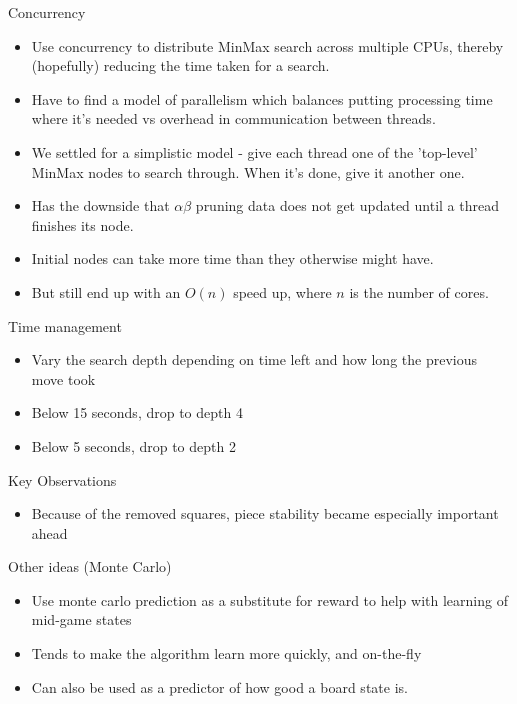 \documentclass{beamer}
\begin{document}
\begin{frame}{Concurrency}
    \begin{itemize}
  \item
	Use concurrency to distribute MinMax search across multiple CPUs, thereby (hopefully) reducing the time taken for a search.
 \item
	Have to find a model of parallelism which balances putting processing time where it's needed vs overhead in communication between threads.
 \item
	We settled for a simplistic model - give each thread one of the 'top-level' MinMax nodes to search through. When it's done, give it another one.
 \item
	Has the downside that $\alpha \beta$ pruning data does not get updated until a thread finishes its node.
 \item
	Initial nodes can take more time than they otherwise might have.
 \item
	But still end up with an $O(n)$ speed up, where $n$ is the number of cores.
  \end{itemize}
\end{frame}

\begin{frame}{Time management}
    \begin{itemize}
  \item
    Vary the search depth depending on time left and how long the previous move took
  \item
    Below 15 seconds, drop to depth 4
  \item
     Below 5 seconds, drop to depth 2  
  \end{itemize}
\end{frame}

\begin{frame}{Key Observations}
    \begin{itemize}
  \item
    Because of the removed squares, piece stability became especially important ahead
  \end{itemize}
\end{frame}

\begin{frame}{Other ideas (Monte Carlo)}
    \begin{itemize}
  \item
    	Use monte carlo prediction as a substitute for reward to help with learning of mid-game states
  \item
	Tends to make the algorithm learn more quickly, and on-the-fly
  \item
	Can also be used as a predictor of how good a board state is.
  \end{itemize}
\end{frame}
\end{document}
